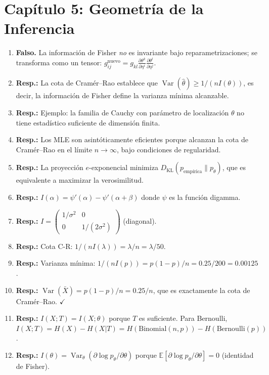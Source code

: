 \section*{Capítulo 5: Geometría de la Inferencia}

\begin{enumerate}
	\item \textbf{Falso.} La información de Fisher \emph{no} es invariante bajo reparametrizaciones; se transforma como un tensor: $g_{ij}^{\text{nuevo}} = g_{kl} \frac{\partial\theta^k}{\partial\eta^i}\frac{\partial\theta^l}{\partial\eta^j}$.
	\item \textbf{Resp.:} La cota de Cramér--Rao establece que $\operatorname{Var}(\hat\theta) \ge 1/(nI(\theta))$, es decir, la información de Fisher define la varianza mínima alcanzable.
	\item \textbf{Resp.:} Ejemplo: la familia de Cauchy con parámetro de localización $\theta$ no tiene estadístico suficiente de dimensión finita.
	\item \textbf{Resp.:} Los MLE son asintóticamente eficientes porque alcanzan la cota de Cramér--Rao en el límite $n \to \infty$, bajo condiciones de regularidad.
	\item \textbf{Resp.:} La proyección $e$-exponencial minimiza $D_{\mathrm{KL}}(p_{\text{empírica}} \| p_\theta)$, que es equivalente a maximizar la verosimilitud.
	\item \textbf{Resp.:} $I(\alpha) = \psi'(\alpha) - \psi'(\alpha+\beta)$ donde $\psi$ es la función digamma.
	\item \textbf{Resp.:} $I = \begin{pmatrix} 1/\sigma^2 & 0 \\ 0 & 1/(2\sigma^2) \end{pmatrix}$ (diagonal).
	\item \textbf{Resp.:} Cota C-R: $1/(nI(\lambda)) = \lambda/n = \lambda/50$.
	\item \textbf{Resp.:} Varianza mínima: $1/(nI(p)) = p(1-p)/n = 0.25/200 = 0.00125$.
	\item \textbf{Resp.:} $\operatorname{Var}(\bar{X}) = p(1-p)/n = 0.25/n$, que es exactamente la cota de Cramér--Rao.  $\checkmark$
	\item \textbf{Resp.:} $I(X; T) = I(X; \theta)$ porque $T$ es suficiente.  Para Bernoulli, $I(X; T) = H(X) - H(X|T) = H(\text{Binomial}(n,p)) - H(\text{Bernoulli}(p))$.
	\item \textbf{Resp.:} $I(\theta) = \operatorname{Var}_\theta(\partial \log p_\theta / \partial \theta)$ porque $\mathbb{E}[\partial \log p_\theta / \partial \theta] = 0$ (identidad de Fisher).

\end{enumerate}
